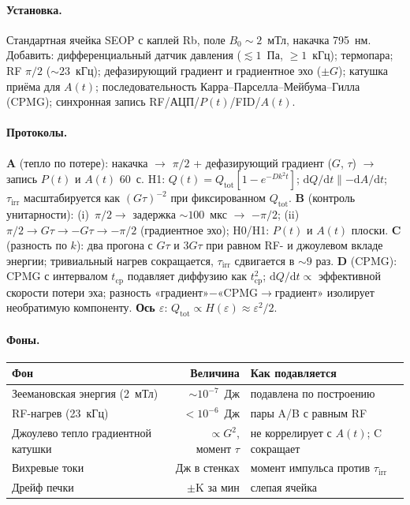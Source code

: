 \documentclass[11pt,a4paper]{article}
\begin{document}
\paragraph{Установка.}
Стандартная ячейка SEOP с каплей Rb, поле $B_0 \sim 2$~мТл, накачка 795~нм. Добавить: дифференциальный датчик давления ($\lesssim 1$~Па, $\ge 1$~кГц); термопара; RF $\pi/2$ ($\sim 23$~кГц); дефазирующий градиент и градиентное эхо ($\pm G$); катушка приёма для $A(t)$; последовательность Карра--Парселла--Мейбума--Гилла (CPMG); синхронная запись RF/АЦП/$P(t)$/FID/$A(t)$.

\paragraph{Протоколы.}
\textbf{A} (тепло по потере): накачка $\to$ $\pi/2$ + дефазирующий градиент ($G$, $\tau$) $\to$ запись $P(t)$ и $A(t)$ 60~с. H1: $Q(t)=Q_{\mathrm{tot}}[1-e^{-Dk^2 t}]$; $\mathrm{d} Q/\mathrm{d} t \parallel -\mathrm{d} A/\mathrm{d} t$; $\tau_{\mathrm{irr}}$ масштабируется как $(G\tau)^{-2}$ при фиксированном $Q_{\mathrm{tot}}$. \textbf{B} (контроль унитарности): (i)~$\pi/2 \to$ задержка $\sim 100$~мкс $\to$ $-\pi/2$; (ii)~$\pi/2 \to G\tau \to -G\tau \to -\pi/2$ (градиентное эхо); H0/H1: $P(t)$ и $A(t)$ плоски. \textbf{C} (разность по $k$): два прогона с $G\tau$ и $3G\tau$ при равном RF- и джоулевом вкладе энергии; тривиальный нагрев сокращается, $\tau_{\mathrm{irr}}$ сдвигается в $\sim 9$ раз. \textbf{D} (CPMG): CPMG с интервалом $t_{\mathrm{cp}}$ подавляет диффузию как $t_{\mathrm{cp}}^2$; $\mathrm{d} Q/\mathrm{d} t \propto$ эффективной скорости потери эха; разность «градиент»$-$«CPMG$\to$градиент» изолирует необратимую компоненту. \textbf{Ось $\varepsilon$}: $Q_{\mathrm{tot}}\propto H(\varepsilon)\approx \varepsilon^2/2$.

\paragraph{Фоны.}\mbox{}\par
\noindent
{\small
\setlength{\tabcolsep}{4pt}
\begin{tabularx}{\textwidth}{|l|r|X|}
\hline
\textbf{Фон} & \textbf{Величина} & \textbf{Как подавляется} \\
\hline
Зеемановская энергия (2~мТл) & $\sim 10^{-7}$~Дж & подавлена по построению \\
RF-нагрев (23~кГц) & $< 10^{-6}$~Дж & пары A/B с равным RF \\
Джоулево тепло градиентной катушки & $\propto G^2$, момент $\tau$ & не коррелирует с $A(t)$; C сокращает \\
Вихревые токи & Дж в стенках & момент импульса против $\tau_{\mathrm{irr}}$ \\
Дрейф печки & $\pm$K за мин & слепая ячейка \\
\hline
\end{tabularx}
}
\end{document}
